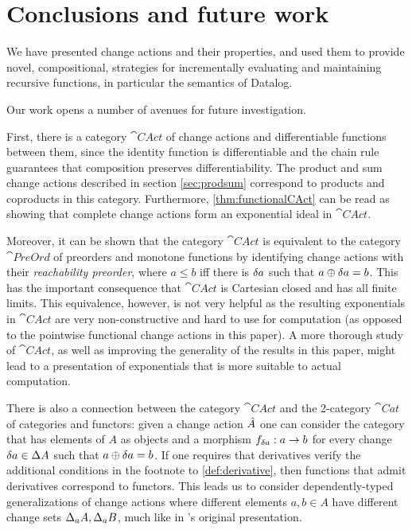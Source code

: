 \section{Conclusions and future work}

We have presented change actions and their properties, and used them to provide
novel, compositional, strategies for incrementally evaluating and maintaining recursive functions, in
particular the semantics of Datalog.

Our work opens a number of avenues for future investigation.

First, there is a category $\cat{CAct}$ of change actions and differentiable
functions between them, since the identity function is differentiable and the chain
rule guarantees that composition preserves differentiability. The product and sum change
actions described in section \cref{sec:prodsum} correspond to products and
coproducts in this category. Furthermore, \cref{thm:functionalCAct} can be
read as showing that complete change actions form an exponential ideal in $\cat{CAct}$.

Moreover, it can be shown that the category $\cat{CAct}$ is equivalent to the category $\cat{PreOrd}$ of
preorders and monotone functions by identifying change actions with their
\emph{reachability preorder}, where $a \leq b$ iff there is $\delta a$ such
that $a \oplus \delta a = b$. This has the important consequence that $\cat{CAct}$ is
Cartesian closed and has all finite limits. This equivalence, however, is not very helpful
as the resulting exponentials in $\cat{CAct}$ are very non-constructive and hard
to use for computation (as opposed to the pointwise functional change actions in
this paper). A more thorough study of $\cat{CAct}$, as well as improving the
generality of the results in this paper, might lead to a
presentation of exponentials that is more suitable to actual computation.

There is also a connection between the category $\cat{CAct}$ and the 2-category 
$\cat{Cat}$ of categories and functors: given a change action $\hat{A}$ one can consider
the category that has elements of $A$ as objects and a morphism $f_{\delta a} : a \rightarrow b$ for
every change $\delta a \in \Delta A$ such that $a \oplus \delta a = b$. If one requires
that derivatives verify the additional conditions in the footnote to
\cref{def:derivative},
then functions that admit derivatives correspond to functors. This leads us to consider dependently-typed
generalizations of change actions where different elements $a, b \in A$ have different change
sets $\Delta _aA, \Delta _aB$, much like in \citeauthor{cai2014changes}'s original presentation.

